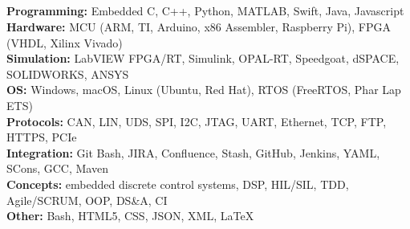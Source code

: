 \documentclass[mm]{res}
\begin{document}



\begin{resume}

\npspctoprule
\section{\headingskills}


\tb \textbf{Programming:} Embedded C, C++, Python, MATLAB, Swift, Java, Javascript \\
\tb \textbf{Hardware:} MCU (ARM, TI, Arduino, x86 Assembler, Raspberry Pi), FPGA (VHDL, Xilinx Vivado)\\
\tb \textbf{Simulation:} LabVIEW FPGA/RT, Simulink, OPAL-RT, Speedgoat, dSPACE, SOLIDWORKS, ANSYS \\
\tb \textbf{OS:} Windows, macOS, Linux (Ubuntu, Red Hat), RTOS (FreeRTOS, Phar Lap ETS) \\
\tb \textbf{Protocols:} CAN, LIN, UDS, SPI, I2C, JTAG, UART, Ethernet, TCP, FTP, HTTPS, PCIe \\
\tb \textbf{Integration:} Git Bash, JIRA, Confluence, Stash, GitHub, Jenkins, YAML, SCons, GCC, Maven \\
\tb \textbf{Concepts:} embedded discrete control systems, DSP, HIL/SIL, TDD, Agile/SCRUM, OOP, DS\&A, CI \\
\tb \textbf{Other:} Bash, HTML5, CSS, JSON, XML, \LaTeX \xspace


\end{resume}
\end{document}
